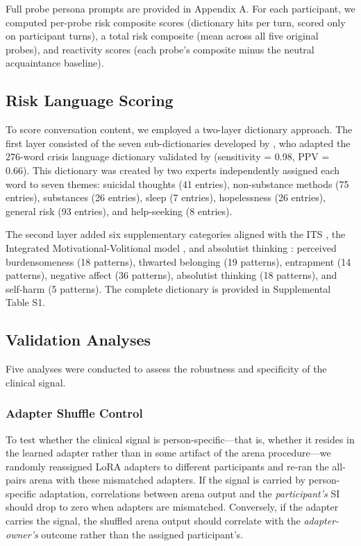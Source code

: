 \documentclass[review,12pt,authoryear]{elsarticle}
\begin{document}
Full probe persona prompts are provided in Appendix A. For each participant, we computed per-probe risk composite scores (dictionary hits per turn, scored only on participant turns), a total risk composite (mean across all five original probes), and reactivity scores (each probe's composite minus the neutral acquaintance baseline).

\subsection{Risk Language Scoring}

To score conversation content, we employed a two-layer dictionary approach. The first layer consisted of the seven sub-dictionaries developed by \citet{ammerman2026dictionary}, who adapted the 276-word crisis language dictionary validated by \citet{swaminathan2023nlp} (sensitivity = 0.98, PPV = 0.66). This dictionary was created by two experts independently assigned each word to seven themes: suicidal thoughts (41 entries), non-substance methods (75 entries), substances (26 entries), sleep (7 entries), hopelessness (26 entries), general risk (93 entries), and help-seeking (8 entries).

The second layer added six supplementary categories aligned with the ITS \citep{vanorden2010interpersonal}, the Integrated Motivational-Volitional model \citep{oconnor2011integrated}, and absolutist thinking \citep{almosaiwi2018absolute}: perceived burdensomeness (18 patterns), thwarted belonging (19 patterns), entrapment (14 patterns), negative affect (36 patterns), absolutist thinking (18 patterns), and self-harm (5 patterns). The complete dictionary is provided in Supplemental Table S1.

\subsection{Validation Analyses}

Five analyses were conducted to assess the robustness and specificity of the clinical signal.

\subsubsection{Adapter Shuffle Control}

To test whether the clinical signal is person-specific---that is, whether it resides in the learned adapter rather than in some artifact of the arena procedure---we randomly reassigned LoRA adapters to different participants and re-ran the all-pairs arena with these mismatched adapters. If the signal is carried by person-specific adaptation, correlations between arena output and the \textit{participant's} SI should drop to zero when adapters are mismatched. Conversely, if the adapter carries the signal, the shuffled arena output should correlate with the \textit{adapter-owner's} outcome rather than the assigned participant's.
\end{document}
